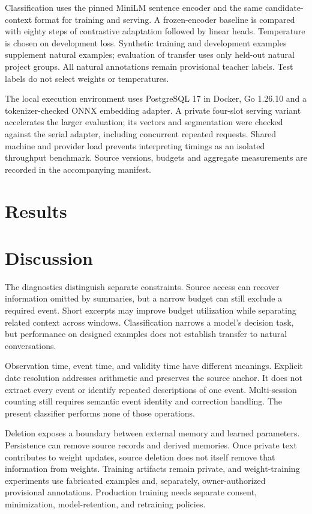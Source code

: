 \documentclass[11pt]{article}
\begin{document}
Classification uses the pinned MiniLM sentence encoder and the same candidate-context format for training and serving. A frozen-encoder baseline is compared with eighty steps of contrastive adaptation followed by linear heads. Temperature is chosen on development loss. Synthetic training and development examples supplement natural examples; evaluation of transfer uses only held-out natural project groups. All natural annotations remain provisional teacher labels. Test labels do not select weights or temperatures.

The local execution environment uses PostgreSQL 17 in Docker, Go 1.26.10 and a tokenizer-checked ONNX embedding adapter. A private four-slot serving variant accelerates the larger evaluation; its vectors and segmentation were checked against the serial adapter, including concurrent repeated requests. Shared machine and provider load prevents interpreting timings as an isolated throughput benchmark. Source versions, budgets and aggregate measurements are recorded in the accompanying manifest.

\section{Results}


\section{Discussion}
The diagnostics distinguish separate constraints. Source access can recover information omitted by summaries, but a narrow budget can still exclude a required event. Short excerpts may improve budget utilization while separating related context across windows. Classification narrows a model's decision task, but performance on designed examples does not establish transfer to natural conversations.

Observation time, event time, and validity time have different meanings. Explicit date resolution addresses arithmetic and preserves the source anchor. It does not extract every event or identify repeated descriptions of one event. Multi-session counting still requires semantic event identity and correction handling. The present classifier performs none of those operations.

Deletion exposes a boundary between external memory and learned parameters. Persistence can remove source records and derived memories. Once private text contributes to weight updates, source deletion does not itself remove that information from weights. Training artifacts remain private, and weight-training experiments use fabricated examples and, separately, owner-authorized provisional annotations. Production training needs separate consent, minimization, model-retention, and retraining policies.
\end{document}
